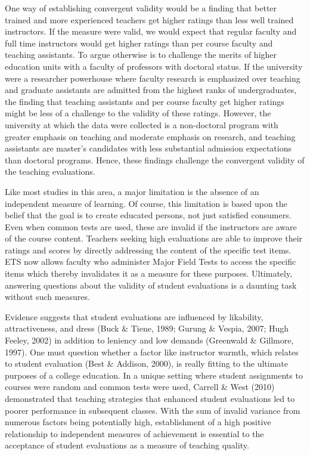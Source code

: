 \documentclass[man]{apa6}
\theoremstyle{definition}
\theoremstyle{definition}
\theoremstyle{definition}
\theoremstyle{remark}
\begin{document}
One way of establishing convergent validity would be a finding that
better trained and more experienced teachers get higher ratings than
less well trained instructors. If the measure were valid, we would
expect that regular faculty and full time instructors would get higher
ratings than per course faculty and teaching assistants. To argue
otherwise is to challenge the merits of higher education units with a
faculty of professors with doctoral status. If the university were a
researcher powerhouse where faculty research is emphasized over teaching
and graduate assistants are admitted from the highest ranks of
undergraduates, the finding that teaching assistants and per course
faculty get higher ratings might be less of a challenge to the validity
of these ratings. However, the university at which the data were
collected is a non-doctoral program with greater emphasis on teaching
and moderate emphasis on research, and teaching assistants are master's
candidates with less substantial admission expectations than doctoral
programs. Hence, these findings challenge the convergent validity of the
teaching evaluations.

Like most studies in this area, a major limitation is the absence of an
independent measure of learning. Of course, this limitation is based
upon the belief that the goal is to create educated persons, not just
satisfied consumers. Even when common tests are used, these are invalid
if the instructors are aware of the course content. Teachers seeking
high evaluations are able to improve their ratings and scores by
directly addressing the content of the specific test items. ETS now
allows faculty who administer Major Field Tests to access the specific
items which thereby invalidates it as a measure for these purposes.
Ultimately, answering questions about the validity of student
evaluations is a daunting task without such measures.

Evidence suggests that student evaluations are influenced by likability,
attractiveness, and dress (Buck \& Tiene, 1989; Gurung \& Vespia, 2007;
Hugh Feeley, 2002) in addition to leniency and low demands (Greenwald \&
Gillmore, 1997). One must question whether a factor like instructor
warmth, which relates to student evaluation (Best \& Addison, 2000), is
really fitting to the ultimate purposes of a college education. In a
unique setting where student assignments to courses were random and
common tests were used, Carrell \& West (2010) demonstrated that
teaching strategies that enhanced student evaluations led to poorer
performance in subsequent classes. With the sum of invalid variance from
numerous factors being potentially high, establishment of a high
positive relationship to independent measures of achievement is
essential to the acceptance of student evaluations as a measure of
teaching quality.
\end{document}
